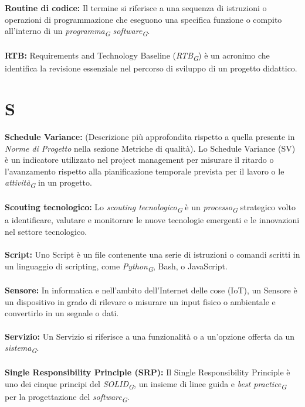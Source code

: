 \documentclass{article}
\begin{document}
\\
\\
\textbf{Routine di codice:} Il termine si riferisce a una sequenza di istruzioni o operazioni di programmazione che eseguono una specifica funzione o compito all'interno di un \textit{programma}\textsubscript{\textit{G}} \textit{software}\textsubscript{\textit{G}}.
\\
\\
\textbf{RTB:} Requirements and Technology Baseline (\textit{RTB}\textsubscript{\textit{G}}) è un acronimo che identifica la revisione essenziale nel percorso di sviluppo di un progetto didattico.
\\
\pagebreak
\section*{S}
{}
\textbf{Schedule Variance:} (Descrizione più approfondita rispetto a quella presente in \textit{Norme di Progetto} nella sezione Metriche di qualità). Lo Schedule Variance (SV) è un indicatore utilizzato nel project management per misurare il ritardo o l'avanzamento rispetto alla pianificazione temporale prevista per il lavoro o le \textit{attività}\textsubscript{\textit{G}} in un progetto.
\\
\\
\textbf{Scouting tecnologico:} Lo \textit{scouting tecnologico}\textsubscript{\textit{G}} è un \textit{processo}\textsubscript{\textit{G}} strategico volto a identificare, valutare e monitorare le nuove tecnologie emergenti e le innovazioni nel settore tecnologico.
\\
\\
\textbf{Script:} Uno Script è un file contenente una serie di istruzioni o comandi scritti in un linguaggio di scripting, come \textit{Python}\textsubscript{\textit{G}}, Bash, o JavaScript.
\\
\\
\textbf{Sensore:} In informatica e nell'ambito dell'Internet delle cose (IoT), un Sensore è un dispositivo in grado di rilevare o misurare un input fisico o ambientale e convertirlo in un segnale o dati.
\\
\\
\textbf{Servizio:} Un Servizio si riferisce a una funzionalità o a un'opzione offerta da un \textit{sistema}\textsubscript{\textit{G}}.
\\
\\
\textbf{Single Responsibility Principle (SRP):} Il Single Responsibility Principle è uno dei cinque principi del \textit{SOLID}\textsubscript{\textit{G}}, un insieme di linee guida e \textit{best practice}\textsubscript{\textit{G}} per la progettazione del \textit{software}\textsubscript{\textit{G}}.
\end{document}
